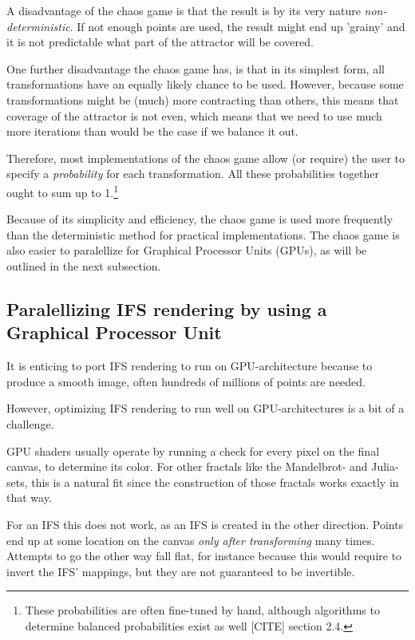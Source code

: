 \documentclass[11pt]{article}
\newcommand*{\altasterism}{\vspace*{1em plus .5em minus .5em}\noindent\hspace*{\fill}\ding{104}\hspace*{\fill}}
\begin{document}
A disadvantage of the chaos game is that the result is by its very nature \emph{non-deterministic}.
If not enough points are used, the result might end up 'grainy' and it is not predictable what part of the attractor will be covered.


One further disadvantage the chaos game has, is that in its simplest form, all transformations have an equally likely chance to be used.
However, because some transformations might be (much) more contracting than others, this means that coverage of the attractor is not even,
which means that we need to use much more iterations than would be the case if we balance it out.

Therefore, most implementations of the chaos game allow (or require) the user to specify a \emph{probability} for each transformation.
All these probabilities together ought to sum up to 1.\footnote{These probabilities are often fine-tuned by hand, although algorithms to determine balanced probabilities exist as well [CITE] section 2.4.}

\altasterism

Because of its simplicity and efficiency, the chaos game is used more frequently than the deterministic method for practical implementations.
The chaos game is also easier to paralellize for Graphical Processor Units (GPUs), as will be outlined in the next subsection.

\subsection{Paralellizing IFS rendering by using a Graphical Processor Unit}
\label{sec:orgf102595}

It is enticing to port IFS rendering to run on GPU-architecture because to produce a smooth image, often hundreds of millions of points are needed.

However, optimizing IFS rendering to run well on GPU-architectures is a bit of a challenge.

GPU shaders usually operate by running a check for every pixel on the final canvas, to determine its color.
For other fractals like the Mandelbrot- and Julia-sets, this is a natural fit since the construction of those fractals works exactly in that way.

For an IFS this does not work, as an IFS is created in the other direction. Points end up at some location on the canvas \emph{only after transforming} many times.
Attempts to go the other way fall flat, for instance because this would require to invert the IFS' mappings, but they are not guaranteed to be invertible.
\end{document}
